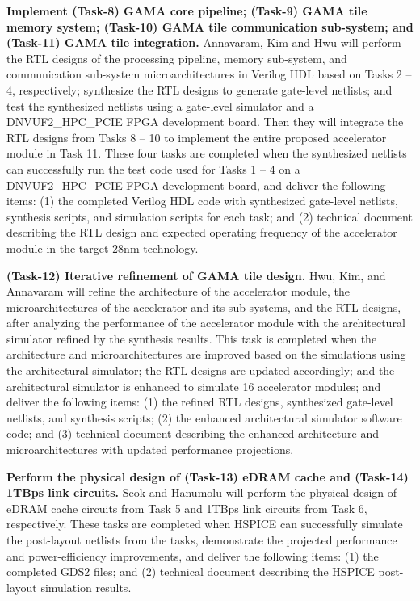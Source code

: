 \vspace{3pt}
\noindent
\textbf{Implement (Task-8) GAMA core pipeline; (Task-9) GAMA tile memory system; (Task-10) GAMA tile communication sub-system; and (Task-11) GAMA tile integration.}
 Annavaram, Kim and Hwu will perform the RTL designs of the processing pipeline, memory sub-system, and communication sub-system microarchitectures in Verilog HDL based on Tasks 2 -- 4, respectively; synthesize the RTL designs to generate gate-level netlists; and test the synthesized netlists using a gate-level simulator and a DNVUF2\_HPC\_PCIE FPGA development board.  
Then they will integrate the RTL designs from Tasks 8 -- 10 to implement the entire proposed accelerator module in Task 11. 
These four tasks are completed when the synthesized netlists can successfully run the test code used for Tasks 1 -- 4 on a DNVUF2\_HPC\_PCIE FPGA development board, and deliver the following items:
(1) the completed Verilog HDL code with synthesized gate-level netlists, synthesis scripts, and simulation scripts for each task; and 
(2) technical document describing the RTL design and expected operating frequency of the accelerator module in the target 28nm technology.


\vspace{3pt}
\noindent
\textbf{(Task-12) Iterative refinement of GAMA tile design.} 
Hwu, Kim, and Annavaram will refine the architecture of the accelerator module, the microarchitectures of the accelerator and its sub-systems, and the RTL designs, after analyzing the performance of the accelerator module with the architectural simulator refined by the synthesis results.
This task is completed when 
the architecture and microarchitectures are improved based on the simulations using the architectural simulator; 
the RTL designs are updated accordingly; and
the architectural simulator is enhanced to simulate 16 accelerator modules; and 
deliver the following items:
(1) the refined RTL designs, synthesized gate-level netlists, and synthesis scripts; 
(2) the enhanced architectural simulator software code; and
(3) technical document describing the enhanced architecture and microarchitectures with updated performance projections.


\vspace{3pt}
\noindent
\textbf{Perform the physical design of (Task-13) eDRAM cache and (Task-14)  1TBps link circuits.} 
Seok and Hanumolu will perform the physical design of eDRAM cache circuits from Task 5 and 1TBps link circuits from Task 6, respectively.
These tasks are completed when HSPICE can successfully simulate the post-layout netlists from the tasks, demonstrate the projected performance and power-efficiency improvements, and deliver the following items:
(1) the completed GDS2 files; and (2) technical document describing the HSPICE post-layout simulation results.


